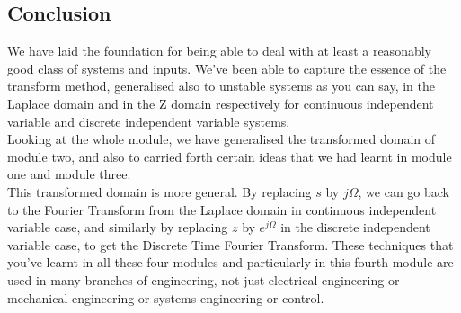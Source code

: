 \subsection{Conclusion}
We have laid the foundation for being able to deal with at least a reasonably good class of systems and inputs. We've been able to capture the essence of the transform method, generalised also to unstable systems as you can say, in the Laplace domain and in the Z domain respectively for continuous independent variable and discrete independent variable systems.\\
Looking at the whole module, we have generalised the transformed domain of module two, and also to carried forth certain ideas that we had learnt in module one and module three.\\
This transformed domain is more general. By replacing $s$ by $j\Omega$, we can go back to the Fourier Transform from the Laplace domain in continuous independent variable case, and similarly by replacing $z$ by $e^{j\Omega}$ in the discrete independent variable case, to get the Discrete Time Fourier Transform. These techniques that you've learnt in all these four modules and particularly in this fourth module are used in many branches of engineering, not just electrical engineering or mechanical engineering or systems engineering or control.

